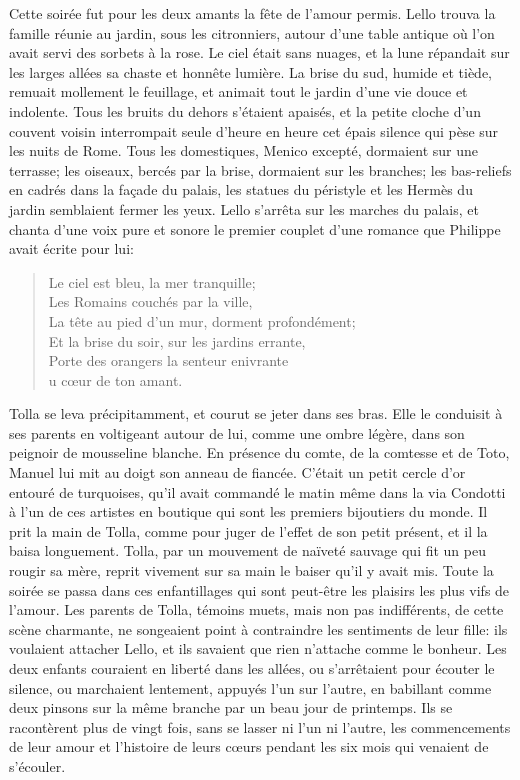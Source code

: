 Cette soirée fut pour les deux amants la fête de l'amour permis. Lello
trouva la famille réunie au jardin, sous les citronniers, autour d'une
table antique où l'on avait servi des sorbets à la rose. Le ciel était
sans nuages, et la lune répandait sur les larges allées sa chaste et
honnête lumière. La brise du sud, humide et tiède, remuait mollement le
feuillage, et animait tout le jardin d'une vie douce et indolente. Tous
les bruits du dehors s'étaient apaisés, et la petite cloche d'un couvent
voisin interrompait seule d'heure en heure cet épais silence qui pèse
sur les nuits de Rome. Tous les domestiques, Menico excepté, dormaient
sur une terrasse; les oiseaux, bercés par la brise, dormaient sur les
branches; les bas-reliefs en cadrés dans la façade du palais, les
statues du péristyle et les Hermès du jardin semblaient fermer les yeux.
Lello s'arrêta sur les marches du palais, et chanta d'une voix pure et
sonore le premier couplet d'une romance que Philippe avait écrite pour
lui:

\begin{quote}
Le ciel est bleu, la mer tranquille;\\
Les Romains couchés par la ville,\\
La tête au pied d’un mur, dorment profondément;\\
Et la brise du soir, sur les jardins errante,\\
Porte des orangers la senteur enivrante\\
u cœur de ton amant.
\end{quote}

Tolla se leva précipitamment, et courut se jeter dans ses bras. Elle le
conduisit à ses parents en voltigeant autour de lui, comme une ombre
légère, dans son peignoir de mousseline blanche. En présence du comte,
de la comtesse et de Toto, Manuel lui mit au doigt son anneau de
fiancée. C'était un petit cercle d'or entouré de turquoises, qu'il avait
commandé le matin même dans la via Condotti à l'un de ces artistes en
boutique qui sont les premiers bijoutiers du monde. Il prit la main de
Tolla, comme pour juger de l'effet de son petit présent, et il la baisa
longuement. Tolla, par un mouvement de naïveté sauvage qui fit un peu
rougir sa mère, reprit vivement sur sa main le baiser qu'il y avait mis.
Toute la soirée se passa dans ces enfantillages qui sont peut-être les
plaisirs les plus vifs de l'amour. Les parents de Tolla, témoins muets,
mais non pas indifférents, de cette scène charmante, ne songeaient point
à contraindre les sentiments de leur fille: ils voulaient attacher
Lello, et ils savaient que rien n'attache comme le bonheur. Les deux
enfants couraient en liberté dans les allées, ou s'arrêtaient pour
écouter le silence, ou marchaient lentement, appuyés l'un sur l'autre,
en babillant comme deux pinsons sur la même branche par un beau jour de
printemps. Ils se racontèrent plus de vingt fois, sans se lasser ni l'un
ni l'autre, les commencements de leur amour et l'histoire de leurs cœurs
pendant les six mois qui venaient de s'écouler.

